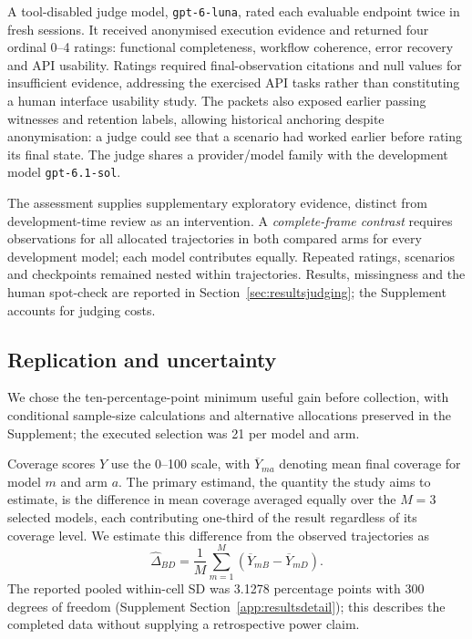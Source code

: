 A tool-disabled judge model, \texttt{gpt-6-luna}, rated each
evaluable endpoint twice in fresh sessions. It received anonymised
execution evidence and returned four ordinal 0--4 ratings:
functional completeness, workflow coherence, error recovery and API
usability. Ratings required final-observation citations and null values for insufficient evidence, addressing the exercised API tasks rather than constituting a human interface usability study. The packets also exposed
earlier passing witnesses and retention labels, allowing historical
anchoring despite anonymisation: a judge could see that a scenario had
worked earlier before rating its final state. The judge shares a provider/model family
with the development model \texttt{gpt-6.1-sol}.

The assessment supplies supplementary exploratory evidence, distinct from development-time review as an intervention. A
\emph{complete-frame contrast} requires observations for all allocated
trajectories in both compared arms for every development model; each model
contributes equally. Repeated ratings, scenarios
and checkpoints remained nested within trajectories. Results, missingness
and the human spot-check are reported in Section~\ref{sec:resultsjudging};
the Supplement accounts for judging costs.

\subsection{Replication and uncertainty}\label{sec:protocollimits}

We chose the ten-percentage-point minimum useful gain before collection, with conditional sample-size calculations and alternative allocations preserved in the Supplement; the executed selection was 21 per model and arm.

Coverage scores $Y$ use the 0--100 scale, with $\overline{Y}_{ma}$ denoting mean final coverage for model $m$ and arm $a$.
The primary estimand, the quantity the study aims to estimate, is the
difference in mean coverage averaged equally over the $M=3$ selected models,
each contributing one-third of the result regardless of its coverage level.
We estimate this difference from the observed trajectories as
\begin{equation}
\widehat{\Delta}_{BD}=\frac{1}{M}
\sum_{m=1}^{M}(\overline{Y}_{mB}-\overline{Y}_{mD}).
\label{eq:primarycontrast}
\end{equation}
The reported pooled within-cell SD was 3.1278 percentage points with
300 degrees of freedom (Supplement Section~\ref{app:resultsdetail}); this
describes the completed data without supplying a retrospective power claim.

